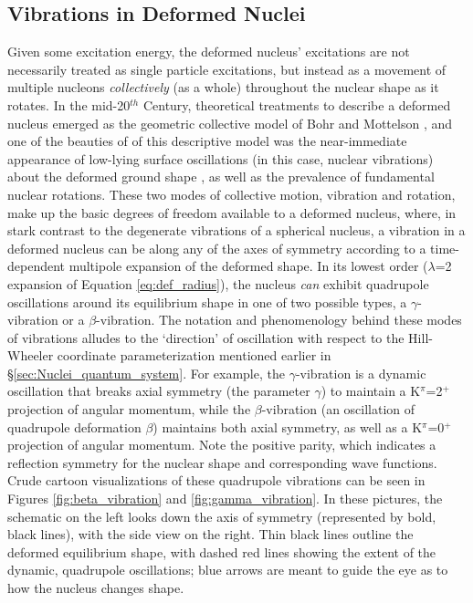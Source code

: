 \subsection{Vibrations in Deformed Nuclei}
Given some excitation energy, the deformed nucleus' excitations are not necessarily treated as single particle excitations, but instead as a movement of multiple nucleons \textit{collectively} (as a whole) throughout the nuclear shape as it rotates. In the mid-20$^{th}$ Century, theoretical treatments to describe a deformed nucleus emerged as the geometric collective model of Bohr and Mottelson \cite{BohrMott_text}, and one of the beauties of of this descriptive model was the near-immediate appearance of low-lying surface oscillations (in this case, nuclear vibrations) about the deformed ground shape \cite{BohrMott_text}, as well as the prevalence of fundamental nuclear rotations. These two modes of collective motion, vibration and rotation, make up the basic degrees of freedom available to a deformed nucleus, where, in stark contrast to the degenerate vibrations of a spherical nucleus, a vibration in a deformed nucleus can be along any of the axes of symmetry according to a time-dependent multipole expansion of the deformed shape. In its lowest order ($\lambda$=2 expansion of Equation \ref{eq:def_radius}), the nucleus \textit{can} exhibit quadrupole oscillations around its equilibrium shape in one of two possible types, a $\gamma$-vibration or a $\beta$-vibration. The notation and phenomenology behind these modes of vibrations alludes to the `direction' of oscillation with respect to the Hill-Wheeler coordinate parameterization mentioned earlier in \S\ref{sec:Nuclei_quantum_system}. For example, the $\gamma$-vibration is a dynamic oscillation that breaks axial symmetry (the parameter $\gamma$) to maintain a K$^\pi$=2$^+$ projection of angular momentum, while the $\beta$-vibration (an oscillation of quadrupole deformation $\beta$) maintains both axial symmetry, as well as a K$^\pi$=0$^+$ projection of angular momentum. Note the positive parity, which indicates a reflection symmetry for the nuclear shape and corresponding wave functions. Crude cartoon visualizations of these quadrupole vibrations can be seen in Figures \ref{fig:beta_vibration} and \ref{fig:gamma_vibration}. In these pictures, the schematic on the left looks down the axis of symmetry (represented by bold, black lines), with the side view on the right. Thin black lines outline the deformed equilibrium shape, with dashed red lines showing the extent of the dynamic, quadrupole oscillations; blue arrows are meant to guide the eye as to how the nucleus changes shape. 

